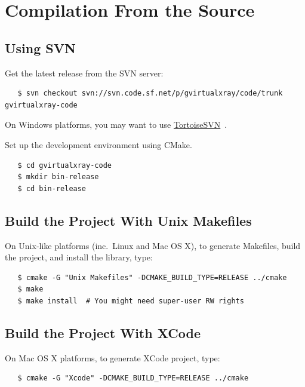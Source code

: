 \documentclass[11pt,oneside,a4paper,final]{article}
\begin{document}
\newpage
\section{Compilation From the Source}

\subsection{Using SVN}
Get the latest release from the \Gls{SVN} server:
\begin{verbatim}
   $ svn checkout svn://svn.code.sf.net/p/gvirtualxray/code/trunk gvirtualxray-code
\end{verbatim}
On Windows platforms, you may want to use \href{http://tortoisesvn.tigris.org/}{TortoiseSVN}~\cite{tortoisesvn}.

Set up the development environment using CMake.
\begin{verbatim}
   $ cd gvirtualxray-code
   $ mkdir bin-release
   $ cd bin-release
\end{verbatim}

\subsection{Build the Project With Unix Makefiles}
On Unix-like platforms (inc.~Linux and Mac OS X), to generate Makefiles, build the project, and install the library, type:
\begin{verbatim}
   $ cmake -G "Unix Makefiles" -DCMAKE_BUILD_TYPE=RELEASE ../cmake
   $ make
   $ make install  # You might need super-user RW rights
\end{verbatim}

\subsection{Build the Project With XCode}
On Mac OS X platforms, to generate XCode project, type:
\begin{verbatim}
   $ cmake -G "Xcode" -DCMAKE_BUILD_TYPE=RELEASE ../cmake
\end{verbatim}
\end{document}
